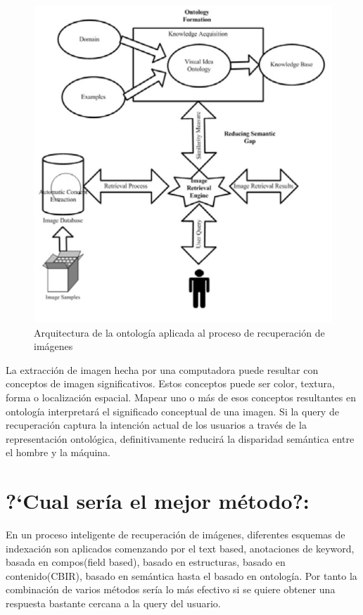 \documentclass{llncs}
\begin{document}
\begin{figure}
    \caption{Arquitectura de la ontolog\'ia aplicada al proceso de recuperaci\'on de im\'agenes}
    \includegraphics[scale = .4]{./images/ontolgy-bases-image-retrieval-process.png}
\end{figure}

La extracci\'on de imagen hecha por una computadora puede resultar con conceptos de imagen 
significativos. Estos conceptos puede ser color, textura, forma o localizaci\'on espacial.
Mapear uno o m\'as de esos conceptos resultantes en ontolog\'ia interpretar\'a el significado 
conceptual de una imagen. Si la query de recuperaci\'on captura la intenci\'on actual de los
usuarios a trav\'es de la representaci\'on ontol\'ogica, definitivamente reducir\'a la disparidad 
sem\'antica entre el hombre y la m\'aquina.   

\noindent

\section*{?`Cual ser\'ia el mejor m\'etodo?:}
En un proceso inteligente de recuperaci\'on de im\'agenes, diferentes esquemas de indexaci\'on 
son aplicados comenzando por el text based, anotaciones de keyword, basada en compos(field based), 
basado en estructuras, basado en contenido(CBIR), basado en sem\'antica hasta el basado en ontolog\'ia.
Por tanto la combinaci\'on de varios m\'etodos ser\'ia lo m\'as efectivo si se quiere obtener una respuesta 
bastante cercana a la query del usuario.
\end{document}
